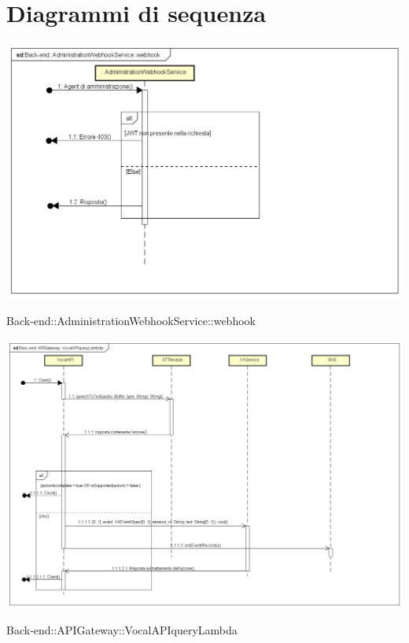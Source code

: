 \section{Diagrammi di sequenza}

\includegraphics[width=\textwidth,height=\textheight,keepaspectratio]{images/diagrams/back-end/Ufficial_Backend/Back-end__AdministrationWebhookService__webhook.png} 	\caption{Back-end::AdministrationWebhookService::webhook}
\includegraphics[width=\textwidth,height=\textheight,keepaspectratio]{images/diagrams/back-end/Ufficial_Backend/Back-end__APIGateway__VocalAPIqueryLambda.png} 	\caption{Back-end::APIGateway::VocalAPIqueryLambda}
